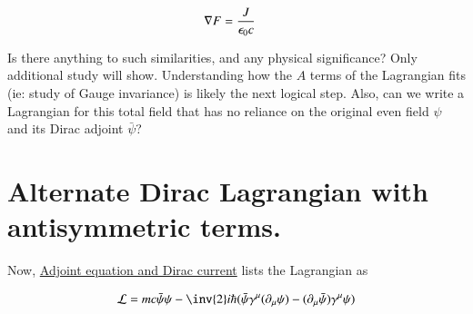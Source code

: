 \documentclass{article}
\begin{document}
\begin{align*}
\nabla F &= \frac{J}{\epsilon_0 c}
\end{align*}

Is there anything to such similarities, and any physical significance?  Only additional study will show.  Understanding how the $A$ terms of the Lagrangian fits (ie: 
study of Gauge invariance) is likely the next logical step.
Also, can we write a Lagrangian for this total field that has no reliance on the original even field $\psi$
and its Dirac adjoint $\bar\psi$?

\section{ Alternate Dirac Lagrangian with antisymmetric terms. }

Now, 
\href{http://en.wikipedia.org/wiki/Dirac_equation#Adjoint_equation_and_Dirac_current}{Adjoint equation and Dirac current} lists the Lagrangian as

\begin{align*}
\LL = mc \bar{\psi}\psi - {\inv{2}i\hbar}(\bar{\psi}\gamma^\mu (\partial_\mu\psi) - (\partial_\mu\bar{\psi})\gamma^\mu \psi)
\end{align*}

%
%
\end{document}
